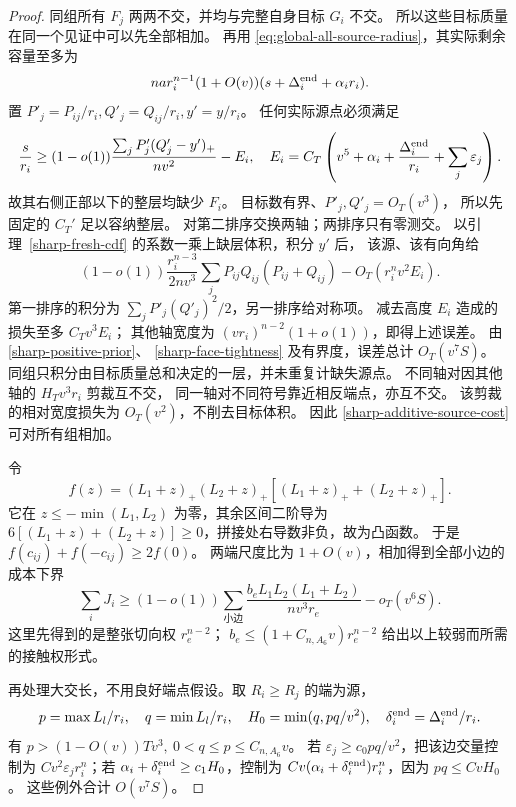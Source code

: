 \begin{proof}
同组所有 \(F_j\) 两两不交，并均与完整自身目标 \(G_i\) 不交。
所以这些目标质量在同一个见证中可以先全部相加。
再用 \eqref{eq:global-all-source-radius}，其实际剩余容量至多为
\[
 na r_i^{n-1}(1+O(v))
       (s+\Delta_i^{\rm end}+\alpha_i r_i).
\]
置 \(P'_j=P_{ij}/r_i,Q'_j=Q_{ij}/r_i,y'=y/r_i\)。
任何实际源点必须满足
\[
 \frac{s}{r_i}\ge
 (1-o(1))\frac{\sum_jP'_j(Q'_j-y')_+}{nv^2}-E_i,\quad
 E_i=C_T\left(v^5+\alpha_i+\frac{\Delta_i^{\rm end}}{r_i}
                              +\sum_j\varepsilon_j\right).
\]
故其右侧正部以下的整层均缺少 \(F_i\)。
目标数有界、\(P'_j,Q'_j=O_T(v^3)\)，
所以先固定的 \(C_T'\) 足以容纳整层。
对第二排序交换两轴；两排序只有零测交。
以引理~\ref{sharp-fresh-cdf} 的系数一乘上缺层体积，积分 \(y'\) 后，
该源、该有向角给
\begin{equation}\label{sharp-additive-source-cost}
 (1-o(1))\frac{r_i^{n-3}}{2nv^3}
 \sum_jP_{ij}Q_{ij}(P_{ij}+Q_{ij})
 -O_T(r_i^nv^2E_i).
\end{equation}
第一排序的积分为 \(\sum_jP'_j(Q'_j)^2/2\)，另一排序给对称项。
减去高度 \(E_i\) 造成的损失至多 \(C_Tv^3E_i\)；
其他轴宽度为 \((vr_i)^{n-2}(1+o(1))\)，即得上述误差。
由 \eqref{sharp-positive-prior}、
\eqref{sharp-face-tightness} 及有界度，误差总计 \(O_T(v^7S)\)。
同组只积分由目标质量总和决定的一层，并未重复计缺失源点。
不同轴对因其他轴的 \(H_Tv^3r_i\) 剪裁互不交，
同一轴对不同符号靠近相反端点，亦互不交。
该剪裁的相对宽度损失为 \(O_T(v^2)\)，不削去目标体积。
因此 \eqref{sharp-additive-source-cost} 可对所有组相加。

令
\[
 f(z)=(L_1+z)_+(L_2+z)_+
       [(L_1+z)_++(L_2+z)_+].
\]
它在 \(z\le-\min(L_1,L_2)\) 为零，其余区间二阶导为
\(6[(L_1+z)+(L_2+z)]\ge0\)，拼接处右导数非负，故为凸函数。
于是 \(f(c_{ij})+f(-c_{ij})\ge2f(0)\)。
两端尺度比为 \(1+O(v)\)，相加得到全部小边的成本下界
\[
 \sum_iJ_i\ge
 (1-o(1))\sum_{\text{小边}}
 \frac{b_eL_1L_2(L_1+L_2)}{nv^3r_e}
 -o_T(v^6S).
\]
这里先得到的是整张切向权 \(r_e^{n-2}\)；
\(b_e\le(1+C_{n,A_6}v)r_e^{n-2}\) 给出以上较弱而所需的接触权形式。

再处理大交长，不用良好端点假设。取 \(R_i\ge R_j\) 的端为源，
\[
 p=\max L_l/r_i,\quad q=\min L_l/r_i,\quad
 H_0=\min(q,pq/v^2),\quad
 \delta_i^{\rm end}=\Delta_i^{\rm end}/r_i.
\]
有 \(p>(1-O(v))Tv^3,\ 0<q\le p\le C_{n,A_6}v\)。
若 \(\varepsilon_j\ge c_0pq/v^2\)，把该边交量控制为
\(C v^2\varepsilon_jr_i^n\)；若
\(\alpha_i+\delta_i^{\rm end}\ge c_1H_0\)，控制为
\(Cv(\alpha_i+\delta_i^{\rm end})r_i^n\)，因为 \(pq\le CvH_0\)。
这些例外合计 \(O(v^7S)\)。


\end{proof}
